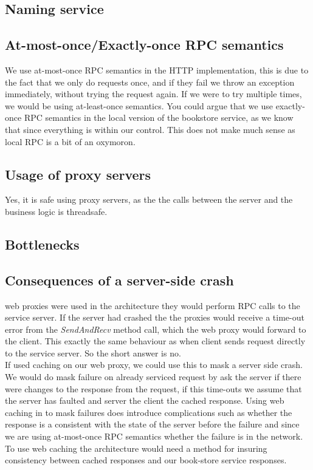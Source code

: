 \documentclass[a4paper]{article}
\begin{document}
\subsection{Naming service}

\subsection{At-most-once/Exactly-once RPC semantics}
We use at-most-once RPC semantics in the HTTP implementation, this is due to the fact that we only do requests once, and if they fail we throw an exception immediately, without trying the request again. If we were to try multiple times, we would be using at-least-once semantics. You could argue that we use exactly-once RPC semantics in the local version of the bookstore service, as we know that since everything is within our control. This does not make much sense as local RPC is a bit of an oxymoron.
\subsection{Usage of proxy servers}
Yes, it is safe using proxy servers, as the the calls between the server and the business logic is threadsafe.
\subsection{Bottlenecks}

\subsection{Consequences of a server-side crash}
web proxies were used in the architecture they would perform RPC calls to the service server. If the server had crashed the the proxies would receive a time-out error from the \textit{SendAndRecv} method call, which the web proxy would forward to the client. This exactly the same behaviour as when client sends request directly to the service server. So the short answer is no.\\
If used caching on our web proxy, we could use this to mask a server side crash. We would do mask failure on already serviced request by ask the server if there were changes to the response from the request, if this time-outs we assume that the server has faulted and server the client the cached response. Using web caching in to mask failures does introduce complications such as whether the response is a consistent with the state of the server before the failure and since we are using at-most-once RPC semantics whether the failure is in the network.\\
To use web caching the architecture would need a method for insuring consistency between cached responses and our book-store service responses.
\end{document}

